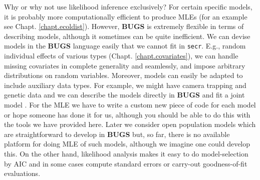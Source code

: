 Why or why not use likelihood inference exclusively? For certain
specific models, it is probably more computationally efficient to
produce MLEs (for an example see Chapt. \ref{chapt.ecoldist}). However, {\bf BUGS} is extremely flexible in terms of
describing models, although it sometimes can be quite inefficient. We can
devise models in the {\bf BUGS} language easily that we cannot fit in
\mbox{\tt secr}. E.g.,
random individual effects of various types
(Chapt. \ref{chapt.covariates}), we can 
handle missing covariates in complete generality and seamlessly, and
impose arbitrary distributions on random variables. Moreover, models
can easily be adapted to include auxiliary data types. For example, we
might have camera trapping and genetic data and we can describe the
models directly in {\bf BUGS} and fit a joint model \citep{gopalaswamy_etal:2012}. For the MLE we have
to write a custom new piece of code for each model or hope someone has
done it for us, although you should be able to do this with the tools
we have provided here.  Later we consider open population models which are
straightforward to develop in {\bf BUGS} but, so far, there is no
available platform for doing MLE of such models, although we imagine one could develop
this.  On
the other hand, likelihood analysis makes it easy to do
model-selection by AIC and in some cases compute standard errors or
carry-out goodness-of-fit evaluations. 
\begin{comment}
Another thing that is more conceptual here is non-CSR point
processes (Chapt. \ref{chapt.state-space}) and generating predictions of how many
individuals have home range centers in any particular polygon.  Basic
benefits of Bayesian analysis have been discussed elsewhere (XXXXXXXX Chapter
2? BPA book? Link and Barker?) and we believe these are compelling.
\end{comment}

\begin{comment}
In summary, basic SCR models are easy to implement by either
likelihood or Bayesian methods but some users might
realize much more flexibility in model development using existing
platforms for Bayesian analysis. While these tend to be slow
(sometimes excruciatingly slow), this will probably not be an
impediment in most problems, especially at some near point in the
future as computers continue to improve.  
Since we spent a lot of time here talking about specific
technical details on how to implement likelihood analysis of SCR
models, we provided a corresponding treatment in the next chapter on
how to devise MCMC algorithms for SCR models. This is a bit more
tedious and requires more coding, but is not technically challenging
(except perhaps to develop highly efficient algorithms which we don't
excel at).
\end{comment}


